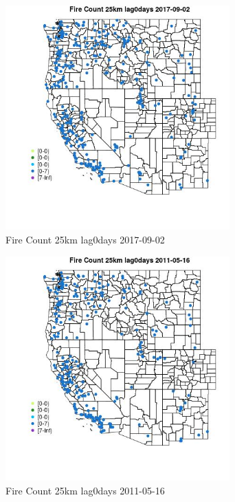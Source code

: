 \begin{figure} 
\centering  
\includegraphics[width=0.77\textwidth]{Code_Outputs/Report_ML_input_PM25_Step4_part_e_de_duplicated_aves_compiled_2019-05-21wNAs_MapObsFire_Count_25km_lag0days2017-09-02.jpg} 
\caption{\label{fig:Report_ML_input_PM25_Step4_part_e_de_duplicated_aves_compiled_2019-05-21wNAsMapObsFire_Count_25km_lag0days2017-09-02}Fire Count 25km lag0days 2017-09-02} 
\end{figure} 
 

\clearpage 

\begin{figure} 
\centering  
\includegraphics[width=0.77\textwidth]{Code_Outputs/Report_ML_input_PM25_Step4_part_e_de_duplicated_aves_compiled_2019-05-21wNAs_MapObsFire_Count_25km_lag0days2011-05-16.jpg} 
\caption{\label{fig:Report_ML_input_PM25_Step4_part_e_de_duplicated_aves_compiled_2019-05-21wNAsMapObsFire_Count_25km_lag0days2011-05-16}Fire Count 25km lag0days 2011-05-16} 
\end{figure} 
 

